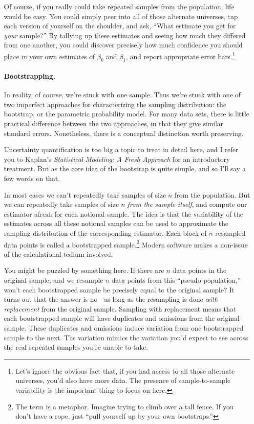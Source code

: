 \documentclass[11pt]{article}
\newcommand{\1}[1]{\mathbf{1}_{\{ {#1} \}}}
\begin{document}
Of course, if you really could take repeated samples from the population, life would be easy.  You could simply peer into all of those alternate universes, tap each version of yourself on the shoulder, and ask, ``What estimate you get for \textit{your} sample?''  By tallying up these estimates and seeing how much they differed from one another, you could discover precisely how much confidence you should place in your own estimates of $\beta_0$ and $\beta_1$, and report appropriate error bars.\footnote{Let's ignore the obvious fact that, if you had access to all those alternate universes, you'd also have more data.  The presence of sample-to-sample variability is the important thing to focus on here.}

\paragraph{Bootstrapping.}

In reality, of course, we're stuck with one sample.  Thus we're stuck with one of two imperfect approaches for characterizing the sampling distribution: the bootstrap, or the parametric probability model.  For many data sets, there is little practical difference between the two approaches, in that they give similar standard errors.  Nonetheless, there is a conceptual distinction worth preserving.

Uncertainty quantification is too big a topic to treat in detail here, and I refer you to Kaplan's \textit{Statistical Modeling: A Fresh Approach} for an introductory treatment.  But as the core idea of the bootstrap is quite simple, and so I'll say a few words on that.

In most cases we can't repeatedly take samples of size $n$ from the population.  But we can repeatedly take samples of size $n$ \textit{from the sample itself}, and compute our estimator afresh for each notional sample.  The idea is that the variability of the estimates across all these notional samples can be used to approximate the sampling distribution of the corresponding estimator.  Each block of $n$ resampled data points is called a bootstrapped sample.\footnote{The term is a metaphor.  Imagine trying to climb over a tall fence.  If you don't have a rope, just ``pull yourself up by your own bootstraps.''}   Modern software makes a non-issue of the calculational tedium involved.

You might be puzzled by something here.  If there are $n$ data points in the original sample, and we resample $n$ data points from this ``pseudo-population,'' won't each bootstrapped sample be precisely equal to the original sample?  It turns out that the answer is no---as long as the resampling is done \textit{with replacement} from the original sample.  Sampling with replacement means that each bootstrapped sample will have duplicates and omissions from the original sample.  These duplicates and omissions induce variation from one bootstrapped sample to the next.  Ths variation mimics the variation you'd expect to see across the real repeated samples you're unable to take.
\end{document}
